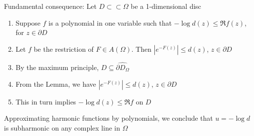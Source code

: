 \documentclass[../main.tex]{subfiles}
\begin{document}
Fundamental consequence: Let $D\subset\subset\Omega$ be a 1-dimensional disc
\begin{enumerate}
\item Suppose $f$ is a polynomial in one variable such that $-\log d(z)\leq\Re f(z)$, for $z\in\partial D$
\item Let $f$ be the restriction of $F\in A(\Omega)$. Then $|e^{-F(z)}|\leq d(z)$, $z\in\partial D$
\item By the maximum principle, $D\subseteq\widehat{\partial D_\Omega}$
\item From the Lemma, we have $|e^{-F(z)}|\leq d(z)$, $z\in\partial D$
\item This in turn implies $-\log d(z)\leq\Re f$ on $D$
\end{enumerate}
Approximating harmonic functions by polynomials, we conclude that $u=-\log d$ is subharmonic on any complex line in $\Omega$
\end{document}
